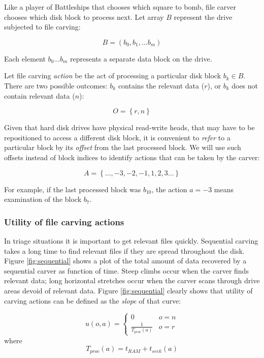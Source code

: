 \documentclass[final,5p,times,twocolumn,authoryear]{elsarticle}
\begin{document}
Like a player of Battleships that chooses which square to bomb, file carver chooses which disk block to process next. Let array $B$ represent the drive subjected to file carving:

\begin{equation}
B=\left(b_0,b_1,\dots b_m \right)
\end{equation}

Each element $b_0 \dots b_m$ represents a separate data block on the drive. 

Let file carving \emph{action} be the act of processing a particular disk block $b_k \in B$. There are two possible outcomes: $b_k$ contains the relevant data ($r$), or $b_k$ does not contain relevant data ($n$):

\begin{equation}
O=\left\{r,n\right\}
\end{equation}

Given that hard disk drives have physical read-write heads, that may have to be repositioned to access a different disk block, it is convenient to \emph{refer} to a particular block by its \emph{offset} from the last processed block. We will use such offsets instead of block indices to identify actions that can be taken by the carver:

\begin{equation}
A=\left\{\dots,-3,-2,-1,1,2,3\dots\right\}
\end{equation}

For example, if the last processed block was $b_{10}$, the action $a=-3$ means examination of the block $b_7$. 

\subsubsection{Utility of file carving actions}
\label{utility-of-carving}

In triage situations it is important to get relevant files quickly. Sequential carving takes a long time to find relevant files if they are spread throughout the disk. Figure \ref{fig:sequential} shows a plot of the total amount of data recovered by a sequential carver as function of time. Steep climbs occur when the carver finds relevant data; long horizontal stretches occur when the carver scans through drive areas devoid of relevant data. Figure \ref{fig:sequential} clearly shows that utility of carving actions can be defined as the \emph{slope} of that curve:

\begin{equation}
\label{eqn:utility-def}
u(o,a)=\begin{cases} 
      0 & o = n \\
      \frac{1}{T_{proc}(a)} & o = r 
   \end{cases}
\end{equation}
where
\begin{equation}
T_{proc}(a) = t_{RAM} + t_{seek}(a)
\end{equation}
\end{document}
